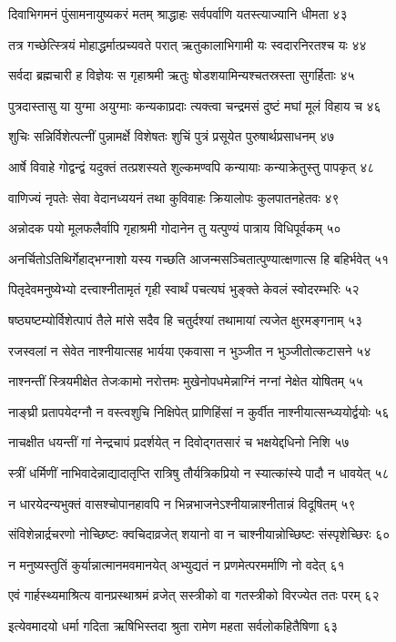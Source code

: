 दिवाभिगमनं पुंसामनायुष्यकरं मतम्
श्राद्धाहः सर्वपर्वाणि यतस्त्याज्यानि धीमता ४३

तत्र गच्छेत्स्त्रियं मोहाद्धर्मात्प्रच्यवते परात्
ऋतुकालाभिगामी यः स्वदारनिरतश्च यः ४४

सर्वदा ब्रह्मचारी ह विज्ञेयः स गृहाश्रमी
ऋतुः षोडशयामिन्यश्चतस्रस्ता सुगर्हिताः ४५

पुत्रदास्तासु या युग्मा अयुग्माः कन्यकाप्रदाः
त्यक्त्वा चन्द्रमसं दुष्टं मघां मूलं विहाय च ४६

शुचिः सन्निर्विशेत्पत्नीं पुन्नामर्क्षे विशेषतः
शुचिं पुत्रं प्रसूयेत पुरुषार्थप्रसाधनम् ४७

आर्षे विवाहे गोद्वन्द्वं यदुक्तं तत्प्रशस्यते
शुल्कमण्वपि कन्यायाः कन्याक्रेतुस्तु पापकृत् ४८

वाणिज्यं नृपतेः सेवा वेदानध्ययनं तथा
कुविवाहः क्रियालोपः कुलपातनहेतवः ४९

अन्नोदक पयो मूलफलैर्वापि गृहाश्रमी
गोदानेन तु यत्पुण्यं पात्राय विधिपूर्वकम् ५०

अनर्चितोऽतिथिर्गेहाद्भग्नाशो यस्य गच्छति
आजन्मसञ्चितात्पुण्यात्क्षणात्स हि बहिर्भवेत् ५१

पितृदेवमनुष्येभ्यो दत्त्वाश्नीतामृतं गृही
स्वार्थं पचत्यघं भुङ्क्ते केवलं स्वोदरम्भरिः ५२

षष्ठ्यष्टम्योर्विशेत्पापं तैले मांसे सदैव हि
चतुर्दश्यां तथामायां त्यजेत क्षुरमङ्गनाम् ५३

रजस्वलां न सेवेत नाश्नीयात्सह भार्यया
एकवासा न भुञ्जीत न भुञ्जीतोत्कटासने ५४

नाश्नन्तीं स्त्रियमीक्षेत तेजःकामो नरोत्तमः
मुखेनोपधमेन्नाग्निं नग्नां नेक्षेत योषितम् ५५

नाङ्घ्री प्रतापयेदग्नौ न वस्त्वशुचि निक्षिपेत्
प्राणिहिंसां न कुर्वीत नाश्नीयात्सन्ध्ययोर्द्वयोः ५६

नाचक्षीत धयन्तीं गां नेन्द्रचापं प्रदर्शयेत्
न दिवोद्गतसारं च भक्षयेद्दधिनो निशि ५७

स्त्रीं धर्मिणीं नाभिवादेन्नाद्यादातृप्ति रात्रिषु
तौर्यत्रिकप्रियो न स्यात्कांस्ये पादौ न धावयेत् ५८

न धारयेदन्यभुक्तं वासश्चोपानहावपि
न भिन्नभाजनेऽश्नीयान्नाश्नीतान्नं विदूषितम् ५९

संविशेन्नार्द्रचरणो नोच्छिष्टः क्वचिदाव्रजेत्
शयानो वा न चाश्नीयान्नोच्छिष्टः संस्पृशेच्छिरः ६०

न मनुष्यस्तुतिं कुर्यान्नात्मानमवमानयेत्
अभ्युद्यतं न प्रणमेत्परमर्माणि नो वदेत् ६१

एवं गार्हस्थ्यमाश्रित्य वानप्रस्थाश्रमं व्रजेत्
सस्त्रीको वा गतस्त्रीको विरज्येत ततः परम् ६२

इत्येवमादयो धर्मा गदिता ऋषिभिस्तदा
श्रुता रामेण महता सर्वलोकहितैषिणा ६३

